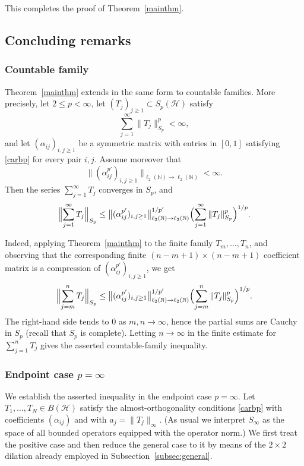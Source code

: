\documentclass[10pt,a4paper]{amsart}
\newcommand{\1}{\mathbf{1}}
\begin{document}
This completes the proof of Theorem~\ref{mainthm}.
\subsection{Concluding remarks}
\subsubsection{Countable family}\label{count1}
Theorem~\ref{mainthm} extends in the same form to countable families. More
precisely, let \(2\le p<\infty\), let \((T_j)_{j\ge1}\subset S_p(\mathcal H)\)
satisfy
\[
\sum_{j=1}^{\infty}\|T_j\|_{S_p}^p<\infty,
\]
and let \((\alpha_{ij})_{i,j\ge1}\) be a symmetric matrix with entries in
\([0,1]\) satisfying \eqref{carbp} for every pair \(i,j\). Assume moreover that
\[
\bigl\|(\alpha_{ij}^{p'})_{i,j\ge1}\bigr\|_{\ell_2(\mathbb N)\to
\ell_2(\mathbb N)}<\infty.
\]
Then the series \(\sum_{j=1}^{\infty}T_j\) converges in \(S_p\), and
\[
\Bigl\|\sum_{j=1}^{\infty}T_j\Bigr\|_{S_p}
\le
 \bigl\|(\alpha_{ij}^{p'})_{i,j\ge1}\bigr\|_{\ell_2(\mathbb N)\to
\ell_2(\mathbb N)}^{1/p'}
\Bigl(\sum_{j=1}^{\infty}\|T_j\|_{S_p}^p\Bigr)^{1/p}.
\]

Indeed, applying Theorem~\ref{mainthm} to the finite family
\(T_m,\dots,T_n\), and observing that the corresponding finite $(n-m+1)\times (n-m+1)$ coefficient
matrix is a compression of \((\alpha_{ij}^{p'})_{i,j\ge1}\), we get
\[
\Bigl\|\sum_{j=m}^{n}T_j\Bigr\|_{S_p}
\le
\bigl\|(\alpha_{ij}^{p'})_{i,j\ge1}\bigr\|_{\ell_2(\mathbb N)\to
\ell_2(\mathbb N)}^{1/p'}
\Bigl(\sum_{j=m}^{n}\|T_j\|_{S_p}^p\Bigr)^{1/p}.
\]
The right-hand side tends to \(0\) as \(m,n\to\infty\), hence the partial sums
are Cauchy in \(S_p\) (recall that $S_{p}$ is complete). Letting \(n\to\infty\) in the finite estimate for
\(\sum_{j=1}^{n}T_j\) gives the asserted countable-family inequality.

\subsubsection{Endpoint case \texorpdfstring{$p=\infty$}{p=infinity}}\label{Grok11}
We establish the asserted inequality in the endpoint case \(p=\infty\). Let \(T_1,\dots,T_N\in B(\mathcal{H})\) satisfy the almost-orthogonality conditions \eqref{carbp} with coefficients \((\alpha_{ij})\) and with \(a_j=\|T_j\|_\infty\). (As usual we interpret \(S_\infty\) as the space of all bounded operators equipped with the operator norm.) We first treat the positive case and then reduce the general case to it by means of the \(2\times 2\) dilation already employed in Subsection~\ref{subsec:general}.
\end{document}
